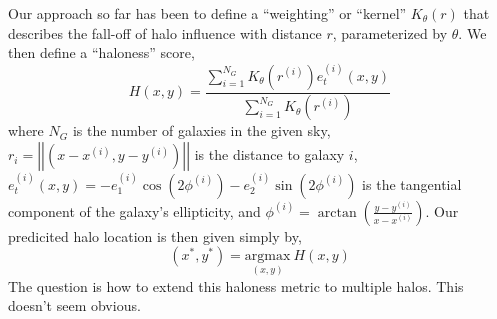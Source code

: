 \documentclass{article}
\renewcommand{\i}{^{(i)}}
\newcommand{\norm}[1]{\left|\left|#1\right|\right|}
\newcommand{\argmax}{\mathrm{argmax}}
\begin{document}
Our approach so far has been to define a ``weighting'' or ``kernel'' $K_{\theta}(r)$ that describes the fall-off of halo influence with distance $r$, parameterized by $\theta$. We then define a ``haloness'' score,
\begin{equation*}
H(x,y) = \frac{\sum_{i=1}^{N_G} K_{\theta}(r\i) e_t\i(x,y)}{\sum_{i=1}^{N_G} K_{\theta} (r\i)}
\end{equation*}
where $N_G$ is the number of galaxies in the given sky, $r_i = \norm{(x - x\i, y - y\i)}$ is the distance to galaxy $i$, $e_t\i(x,y) = -e_1\i \cos(2\phi\i) - e_2\i \sin(2\phi\i)$ is the tangential component of the galaxy's ellipticity, and $\phi\i = \arctan \left(\frac{y - y\i}{x - x\i} \right)$.
Our predicited halo location is then given simply by,
\begin{equation*}
(x^*, y^*) = \underset{(x,y)}{\argmax} \ H(x,y)
\end{equation*}
The question is how to extend this haloness metric to multiple halos. This doesn't seem obvious.
\end{document}
